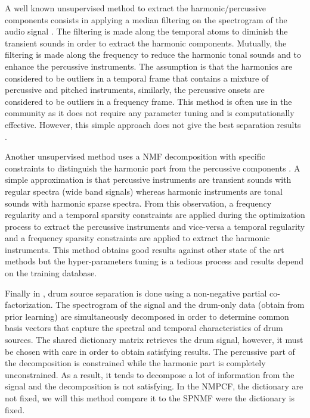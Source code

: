 \documentclass[journal]{IEEEtran}
\begin{document}
A well known unsupervised method to extract the harmonic/percussive components consists in applying a median filtering on the spectrogram of the audio signal \cite{fitzgerald2010harmonic,ono2008separation}. The filtering is made along the temporal atoms to diminish the transient sounds in order to extract the harmonic components. Mutually, the filtering is made along the frequency to reduce the harmonic tonal sounds and to enhance the percussive instruments. The assumption is that the harmonics are considered to be outliers in a temporal frame that contains a mixture of percussive and pitched instruments, similarly, the percussive onsets are considered to be outliers in a frequency frame. This method is often use in the community as it does not require any parameter tuning and is computationally effective. However, this simple approach does not give the best separation results \cite{canadas2014percussive}.

Another unsupervised method uses a NMF decomposition with specific constraints to distinguish the harmonic part from the percussive components \cite{canadas2014percussive}. A simple approximation is that percussive instruments are transient sounds with regular spectra (wide band signals) whereas harmonic instruments are tonal sounds with harmonic sparse spectra. From this observation, a frequency regularity and a temporal sparsity constraints are applied during the optimization process to extract the percussive instruments and vice-versa a temporal regularity and a frequency sparsity constraints are applied to extract the harmonic instruments. This method obtains good results against other state of the art methods \cite{canadas2014percussive} but the hyper-parameters tuning is a tedious process and results depend on the training database.

Finally in \cite{kim2011nonnegative}, drum source separation is done using a non-negative partial co-factorization. The spectrogram of the signal and the drum-only data (obtain from prior learning) are simultaneously decomposed in order to determine common basis vectors that capture the spectral and temporal characteristics of drum sources. The shared dictionary matrix retrieves the drum signal, however, it must be chosen with care in order to obtain satisfying results. The percussive part of the decomposition is constrained while the harmonic part is completely unconstrained. As a result, it tends to decompose a lot of information from the signal and the decomposition is not satisfying. In the NMPCF, the dictionary are not fixed, we will this method compare it to the SPNMF were the dictionary is fixed. 
\end{document}
